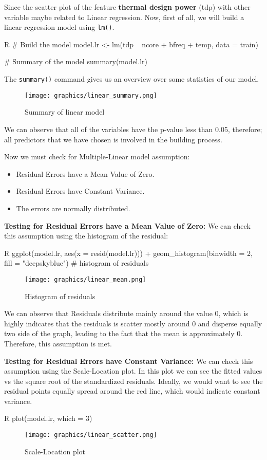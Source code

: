Since the scatter plot of the feature \textbf{thermal design power} (tdp) with other variable maybe related to Linear regression.
Now, first of all, we will build a linear regression model using \verb|lm()|.
\begin{code}{R}
# Build the model
model.lr <- lm(tdp ~ ncore + bfreq + temp, data = train)

# Summary of the model
summary(model.lr)
\end{code}

The \verb|summary()| command gives us an overview over some statistics of our model.
\begin{figure}[H]
    \centering
    \texttt{[image: graphics/linear\_summary.png]}
    \caption{Summary of linear model}
    \label{fig:30}
\end{figure}
We can observe that all of the variables have the p-value less than 0.05, therefore; all predictors that we have chosen is involved in the building process.

Now we must check for Multiple-Linear model assumption:
\begin{itemize}
    \item Residual Errors have a Mean Value of Zero.
    \item Residual Errors have Constant Variance.
    \item The errors are normally distributed.
\end{itemize}

\textbf{Testing for Residual Errors have a Mean Value of Zero:} We can check this assumption using the histogram of the residual:
\begin{code}{R}
ggplot(model.lr, aes(x = resid(model.lr))) +
  geom_histogram(binwidth = 2, fill = "deepskyblue") # histogram of residuals
\end{code}
\begin{figure}[H]
    \centering
    \texttt{[image: graphics/linear\_mean.png]}
    \caption{Histogram of residuals}
    \label{fig:31}
\end{figure}

We can observe that Residuals distribute mainly around the value 0, which is highly indicates that the residuals is scatter mostly around 0 and disperse equally two side of the graph, leading to the fact that the mean is approximately 0. Therefore, this assumption is met.

\textbf{Testing for Residual Errors have Constant Variance:} We can check this assumption using the Scale-Location plot. In this plot we can see the fitted values vs the square root of the standardized residuals. Ideally, we would want to see the residual points equally spread around the red line, which would indicate constant variance.
\begin{code}{R}
plot(model.lr, which = 3)
\end{code}
\begin{figure}[H]
    \centering
    \texttt{[image: graphics/linear\_scatter.png]}
    \caption{Scale-Location plot}
    \label{fig:32}
\end{figure}

